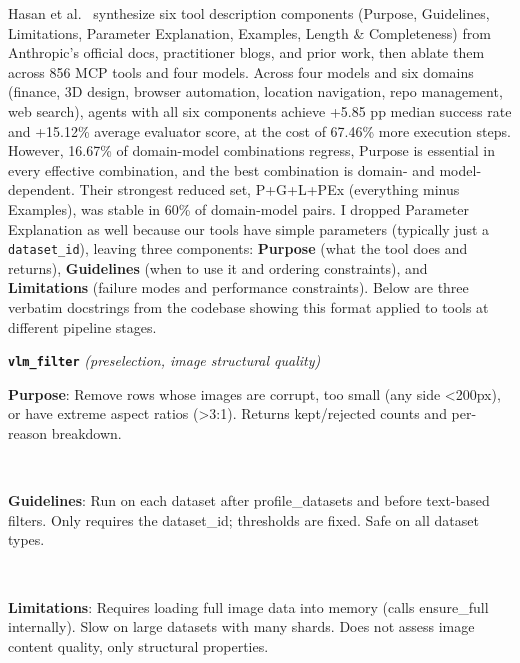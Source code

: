 Hasan et al.~\cite{smellyToolDesc2026} synthesize six tool description components (Purpose, Guidelines, Limitations, Parameter Explanation, Examples, Length \& Completeness) from Anthropic's official docs, practitioner blogs, and prior work, then ablate them across 856 MCP tools and four models. Across four models and six domains (finance, 3D design, browser automation, location navigation, repo management, web search), agents with all six components achieve +5.85 pp median success rate and +15.12\% average evaluator score, at the cost of 67.46\% more execution steps. However, 16.67\% of domain-model combinations regress, Purpose is essential in every effective combination, and the best combination is domain- and model-dependent. Their strongest reduced set, P+G+L+PEx (everything minus Examples), was stable in 60\% of domain-model pairs. I dropped Parameter Explanation as well because our tools have simple parameters (typically just a \texttt{dataset\_id}), leaving three components: \colorbox{purposebg}{\textbf{Purpose}} (what the tool does and returns), \colorbox{guidelinesbg}{\textbf{Guidelines}} (when to use it and ordering constraints), and \colorbox{limitationsbg}{\textbf{Limitations}} (failure modes and performance constraints). Below are three verbatim docstrings from the codebase showing this format applied to tools at different pipeline stages.

\medskip
\noindent\textbf{\texttt{vlm\_filter}} \textit{(preselection, image structural quality)}
\begin{tcolorbox}[enhanced, colback=white, colframe=black!60, boxrule=0.6pt, left=6pt, right=6pt, top=0pt, bottom=0pt, sharp corners, boxsep=0pt]
\colorbox{purposebg}{\parbox{\dimexpr\linewidth-2\fboxsep}{%
\ttfamily\scriptsize\vspace{4pt}
\textbf{Purpose}: Remove rows whose images are corrupt, too
small (any side <200px), or have extreme aspect ratios
(>3:1). Returns kept/rejected counts and per-reason
breakdown.\vspace{4pt}
}}\\[-1pt]
\colorbox{guidelinesbg}{\parbox{\dimexpr\linewidth-2\fboxsep}{%
\ttfamily\scriptsize\vspace{4pt}
\textbf{Guidelines}: Run on each dataset after profile\_datasets
and before text-based filters. Only requires the
dataset\_id; thresholds are fixed. Safe on all
dataset types.\vspace{4pt}
}}\\[-1pt]
\colorbox{limitationsbg}{\parbox{\dimexpr\linewidth-2\fboxsep}{%
\ttfamily\scriptsize\vspace{4pt}
\textbf{Limitations}: Requires loading full image data into
memory (calls ensure\_full internally). Slow on large
datasets with many shards. Does not assess image
content quality, only structural properties.\vspace{4pt}
}}
\end{tcolorbox}

